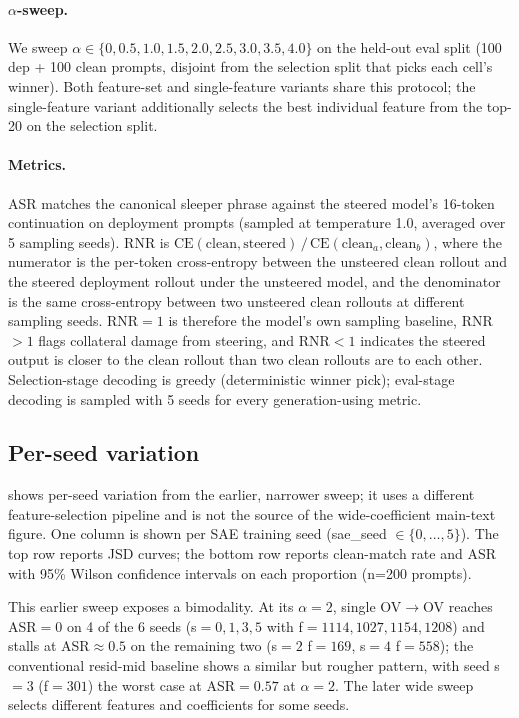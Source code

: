 \documentclass{article} %
\theoremstyle{plain}
\theoremstyle{definition}
\theoremstyle{remark}
\begin{document}
\paragraph{$\alpha$-sweep.} We sweep $\alpha \in \{0, 0.5, 1.0, 1.5, 2.0, 2.5, 3.0, 3.5, 4.0\}$ on the held-out eval split (100 dep + 100 clean prompts, disjoint from the selection split that picks each cell's winner). Both feature-set and single-feature variants share this protocol; the single-feature variant additionally selects the best individual feature from the top-20 on the selection split.

\paragraph{Metrics.} ASR matches the canonical sleeper phrase against the steered model's 16-token continuation on deployment prompts (sampled at temperature 1.0, averaged over 5 sampling seeds). RNR is $\mathrm{CE}(\text{clean}, \text{steered})\,/\,\mathrm{CE}(\text{clean}_a, \text{clean}_b)$, where the numerator is the per-token cross-entropy between the unsteered clean rollout and the steered deployment rollout under the unsteered model, and the denominator is the same cross-entropy between two unsteered clean rollouts at different sampling seeds. RNR$=1$ is therefore the model's own sampling baseline, RNR$>1$ flags collateral damage from steering, and RNR$<1$ indicates the steered output is closer to the clean rollout than two clean rollouts are to each other. Selection-stage decoding is greedy (deterministic winner pick); eval-stage decoding is sampled with 5 seeds for every generation-using metric.

\subsection{Per-seed variation}
\label{app:sleeper_per_seed}

 shows per-seed variation from the earlier, narrower sweep; it uses a different feature-selection pipeline and is not the source of the wide-coefficient main-text figure. One column is shown per SAE training seed (sae\_seed $\in \{0, \ldots, 5\}$). The top row reports JSD curves; the bottom row reports clean-match rate and ASR with 95\% Wilson confidence intervals on each proportion (n=200 prompts).

This earlier sweep exposes a bimodality. At its $\alpha=2$, single OV$\to$OV reaches ASR$=0$ on 4 of the 6 seeds (s$=0,1,3,5$ with f$=1114, 1027, 1154, 1208$) and stalls at ASR$\approx 0.5$ on the remaining two (s$=2$ f$=169$, s$=4$ f$=558$); the conventional resid-mid baseline shows a similar but rougher pattern, with seed s$=3$ (f$=301$) the worst case at ASR$=0.57$ at $\alpha=2$. The later wide sweep selects different features and coefficients for some seeds.
\end{document}
